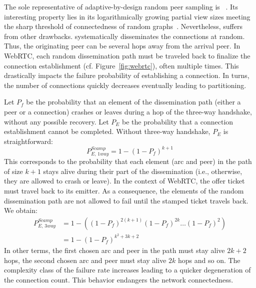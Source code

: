 The sole representative of adaptive-by-design random peer sampling is
\SCAMP~\cite{ganesh2003peer}. Its interesting property lies in its
logarithmically growing partial view sizes meeting the sharp threshold of
connectedness of random graphs~\cite{erdos1959random}. Nevertheless, \SCAMP
suffers from other drawbacks. 
\SCAMP systematically disseminates the connections at random. Thus, the
originating peer can be several hops away from the arrival peer. In WebRTC, each
random dissemination path must be traveled back to finalize the connection
establishment (cf. Figure~\ref{fig:webrtc}), often multiple times. This
drastically impacts the \SCAMP failure probability of establishing a
connection. In turns, the number of connections quickly decreases eventually
leading to partitioning.

Let $P_f$ be the probability that an
element of the dissemination path (either a peer or a connection) crashes or
leaves during a hop of the three-way handshake, without any possible
recovery. Let $P_E$ be the probability that a connection establishment cannot
be completed. Without three-way handshake, $P_E$ is straightforward:
\begin{equation} P_{E,\,1way}^{Scamp}=1-(1- P_f)^{k+1} \end{equation} This
corresponds to the probability that each element (arc and peer) in the path of
size $k+1$ stays alive during their part of the dissemination (i.e., otherwise,
they are allowed to crash or leave). In the context of WebRTC, the offer ticket must
travel back to its emitter. As a consequence, the elements of the random
dissemination path are not allowed to fail until the stamped ticket travels
back. We obtain:
\begin{align} P_{E,\,3way}^{Scamp} &=1 - ((1-P_f)^{2(k+1)} (1-P_f)^{2k}
                                     \ldots (1-P_f)^2) \nonumber \\
                                   &=1-(1-P_f)^{k^2+3k+2}
\end{align}
In other terms, the first chosen arc and peer in the path must stay alive $2k+2$
hops, the second chosen arc and peer must stay alive $2k$ hops and so on.  The
complexity class of the \SCAMP failure rate increases leading to a quicker
degeneration of the connection count. This behavior endangers the network
connectedness.%


